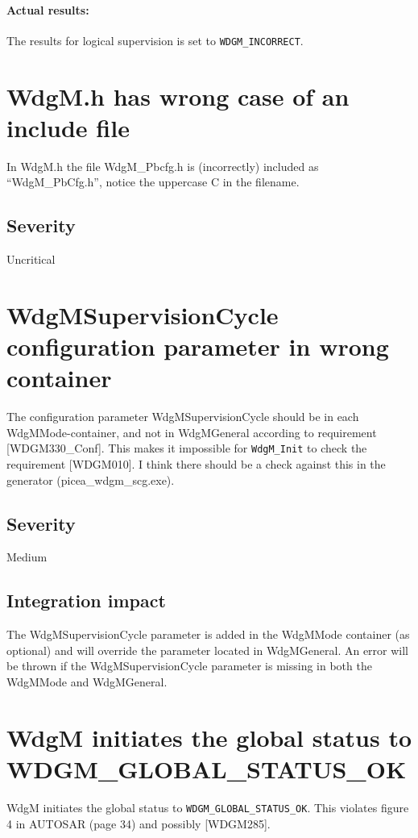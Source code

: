 \paragraph{Actual results:}
The results for logical supervision is set to \lstinline!WDGM_INCORRECT!.

\section{WdgM.h has wrong case of an include file}
In WdgM.h the file WdgM\_Pbcfg.h is (incorrectly) included as
``WdgM\_PbCfg.h'', notice the uppercase C in the filename.

\subsection{Severity}
Uncritical

\section{WdgMSupervisionCycle configuration parameter in wrong
  container}
The configuration parameter WdgMSupervisionCycle should be in each
WdgMMode-container, and not in WdgMGeneral according to requirement
[WDGM330\_Conf]. This makes it impossible for \lstinline!WdgM_Init! to check the
requirement [WDGM010]. I think there should be a check against this
in the generator (picea\_wdgm\_scg.exe).

\subsection{Severity}
Medium

\subsection{Integration impact}
The WdgMSupervisionCycle parameter is added in the WdgMMode container
(as optional) and will override the parameter located in
WdgMGeneral. An error will be thrown if the WdgMSupervisionCycle
parameter is missing in both the WdgMMode and WdgMGeneral.


\section{WdgM initiates the global status to\\
  WDGM\_GLOBAL\_STATUS\_OK}
WdgM initiates the global status to \lstinline!WDGM_GLOBAL_STATUS_OK!.
This violates figure 4 in AUTOSAR (page 34) and possibly [WDGM285].

